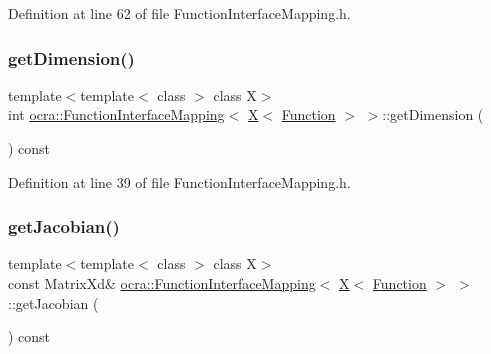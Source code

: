 Definition at line 62 of file Function\+Interface\+Mapping.\+h.

\hypertarget{structocra_1_1FunctionInterfaceMapping_3_01X_3_01Function_01_4_01_4_aa9a3b67499ae7d460a55a83aa3731c73}{}\label{structocra_1_1FunctionInterfaceMapping_3_01X_3_01Function_01_4_01_4_aa9a3b67499ae7d460a55a83aa3731c73} 
\subsubsection{\texorpdfstring{get\+Dimension()}{getDimension()}}
{\footnotesize\ttfamily template$<$template$<$ class $>$ class X$>$ \\
int \hyperlink{structocra_1_1FunctionInterfaceMapping}{ocra\+::\+Function\+Interface\+Mapping}$<$ \hyperlink{namespaceocra_a436781c7059a0f76027df1c652126260a53f3cfeeb322946db40cd86dfebfb237}{X}$<$ \hyperlink{classocra_1_1Function}{Function} $>$ $>$\+::get\+Dimension (\begin{DoxyParamCaption}{ }\end{DoxyParamCaption}) const\hspace{0.3cm}{\ttfamily [inline]}}



Definition at line 39 of file Function\+Interface\+Mapping.\+h.

\hypertarget{structocra_1_1FunctionInterfaceMapping_3_01X_3_01Function_01_4_01_4_a273e455d6ab21d57da6c7f37d9d4a7cb}{}\label{structocra_1_1FunctionInterfaceMapping_3_01X_3_01Function_01_4_01_4_a273e455d6ab21d57da6c7f37d9d4a7cb} 
\subsubsection{\texorpdfstring{get\+Jacobian()}{getJacobian()}\hspace{0.1cm}{\footnotesize\ttfamily [1/2]}}
{\footnotesize\ttfamily template$<$template$<$ class $>$ class X$>$ \\
const Matrix\+Xd\& \hyperlink{structocra_1_1FunctionInterfaceMapping}{ocra\+::\+Function\+Interface\+Mapping}$<$ \hyperlink{namespaceocra_a436781c7059a0f76027df1c652126260a53f3cfeeb322946db40cd86dfebfb237}{X}$<$ \hyperlink{classocra_1_1Function}{Function} $>$ $>$\+::get\+Jacobian (\begin{DoxyParamCaption}{ }\end{DoxyParamCaption}) const\hspace{0.3cm}{\ttfamily [inline]}}



